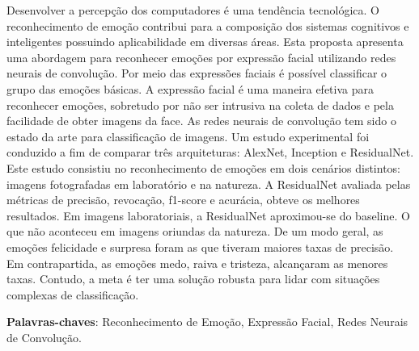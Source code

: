 \documentclass[oldfontcommands,12pt,openright,twoside,a4paper,brazil]{abntex2}
\begin{document}

\begin{resumo}
Desenvolver a percepção dos computadores é uma tendência tecnológica. O reconhecimento de emoção contribui para a composição dos sistemas cognitivos e inteligentes possuindo aplicabilidade em diversas áreas. Esta proposta apresenta uma abordagem para reconhecer emoções por expressão facial utilizando redes neurais de convolução. Por meio das expressões faciais é possível classificar o grupo das emoções básicas. A expressão facial é uma maneira efetiva para reconhecer emoções, sobretudo por não ser intrusiva na coleta de dados e pela facilidade de obter imagens da face. As redes neurais de convolução tem sido o estado da arte para classificação de imagens. Um estudo experimental foi conduzido a fim de comparar três arquiteturas: AlexNet, Inception e ResidualNet.  Este estudo consistiu no reconhecimento de emoções em dois cenários distintos: imagens fotografadas em laboratório e na natureza. A ResidualNet avaliada pelas métricas de precisão, revocação, f1-score e acurácia, obteve os melhores resultados. Em imagens laboratoriais, a ResidualNet aproximou-se do baseline. O que não aconteceu em imagens oriundas da natureza. De um modo geral, as emoções felicidade e surpresa foram as que tiveram maiores taxas de precisão. Em contrapartida, as emoções medo, raiva e tristeza, alcançaram as menores taxas.  Contudo, a meta é ter uma solução robusta para lidar com situações complexas de classificação.  





   \vspace{\onelineskip}
 
   \noindent 
   \textbf{Palavras-chaves}: Reconhecimento de Emoção, Expressão Facial, Redes Neurais de Convolução.
\end{resumo}


\listoffigures*
\cleardoublepage

\listoftables*
\cleardoublepage
\end{document}

